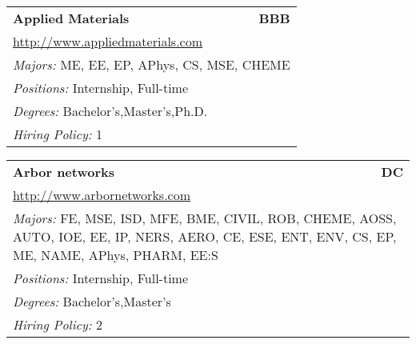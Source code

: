 \documentclass[twoside]{article}
\begin{document}
\begin{center}
\begin{multicols}{3}
\begin{FlushLeft}
\begin{minipage}{.9\columnwidth}
\end{minipage}
 
\begin{minipage}{.9\columnwidth}\begin{tabularx}{.95\columnwidth}{Xr}
                 {\Large\bf Applied Materials} & {\Large\bf BBB}\\
    \multicolumn{2}{p{.95\columnwidth}}{\url{http://www.appliedmaterials.com}}\\
    \multicolumn{2}{p{.95\columnwidth}}{\emph{Majors:} ME, EE, EP, APhys, CS, MSE, CHEME}\\
    \multicolumn{2}{p{.95\columnwidth}}{\emph{Positions:} Internship, Full-time}\\
    \multicolumn{2}{p{.95\columnwidth}}{\emph{Degrees:} Bachelor's,Master's,Ph.D.}\\
    \multicolumn{2}{p{.95\columnwidth}}{\emph{Hiring Policy:} 1}\\
    \end{tabularx}
    
\end{minipage}
 
\begin{minipage}{.9\columnwidth}\begin{tabularx}{.95\columnwidth}{Xr}
                 {\Large\bf Arbor networks} & {\Large\bf DC}\\
    \multicolumn{2}{p{.95\columnwidth}}{\url{http://www.arbornetworks.com}}\\
    \multicolumn{2}{p{.95\columnwidth}}{\emph{Majors:} FE, MSE, ISD, MFE, BME, CIVIL, ROB, CHEME, AOSS, AUTO, IOE, EE, IP, NERS, AERO, CE, ESE, ENT, ENV, CS, EP, ME, NAME, APhys, PHARM, EE:S}\\
    \multicolumn{2}{p{.95\columnwidth}}{\emph{Positions:} Internship, Full-time}\\
    \multicolumn{2}{p{.95\columnwidth}}{\emph{Degrees:} Bachelor's,Master's}\\
    \multicolumn{2}{p{.95\columnwidth}}{\emph{Hiring Policy:} 2}\\
    \end{tabularx}
    
\end{minipage}
 

\end{FlushLeft}
\end{multicols}
\end{center}
\end{document}
